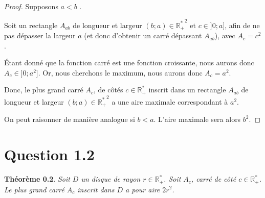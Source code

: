 \documentclass[]{amsart}
\theoremstyle{definition}
\theoremstyle{remark}
\numberwithin{equation}{section}
\begin{document}
\begin{proof}
Supposons $a<b$ .

Soit un rectangle $A_{ab}$ de longueur et largeur $(b;a) \in \mathbb{R_{+}^{\ast}}^2$ et $c \in ]0;a]$, afin de ne pas dépasser la largeur $a$ (et donc d'obtenir un carré dépassant $A_{ab}$), avec $A_c=c^2$.

Étant donné que la fonction carré est une fonction croissante, nous aurons donc $A_c \in ]0;a^2]$. Or, nous cherchons le maximum, nous aurons donc $A_c=a^2$.\newline

Donc, le plus grand carré $A_c$, de côtés $c \in \mathbb{R_{+}^{\ast}}$ inscrit dans un rectangle $A_{ab}$ de longueur et largeur $(b;a) \in \mathbb{R_{+}^{\ast}}^2$ a une aire maximale correspondant à $a^2$.

On peut raisonner de manière analogue si $b<a$. L'aire maximale sera alors $b^2$.
\end{proof}

\begin{center}
\end{center}

\section*{Question 1.2}
\textbf{Théorème 0.2}. \emph{Soit $D$ un disque de rayon $r \in \mathbb{R_{+}^{\ast}}$. Soit $A_c$, carré de côté $c \in \mathbb{R_{+}^{\ast}}$. Le plus grand carré $A_c$ inscrit dans $D$ a pour aire $2r^2$.}
\end{document}
